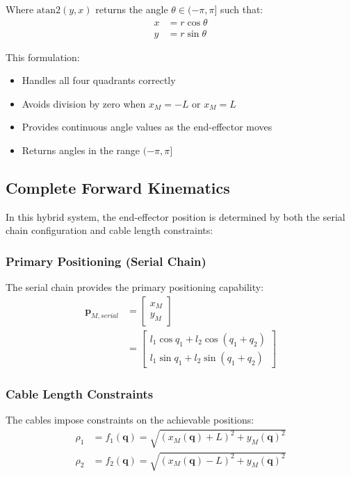 \documentclass[11pt,a4paper]{article}
\begin{document}
Where $\text{atan2}(y, x)$ returns the angle $\theta \in (-\pi, \pi]$ such that:
\begin{align}
x &= r\cos\theta \\
y &= r\sin\theta
\end{align}

This formulation:
\begin{itemize}
    \item Handles all four quadrants correctly
    \item Avoids division by zero when $x_M = -L$ or $x_M = L$
    \item Provides continuous angle values as the end-effector moves
    \item Returns angles in the range $(-\pi, \pi]$
\end{itemize}

\subsection{Complete Forward Kinematics}
In this hybrid system, the end-effector position is determined by both the serial chain configuration and cable length constraints:

\subsubsection{Primary Positioning (Serial Chain)}
The serial chain provides the primary positioning capability:
\begin{align}
\bm{p}_{M,serial} &= \begin{bmatrix} x_M \\ y_M \end{bmatrix} \\
&= \begin{bmatrix} l_1 \cos q_1 + l_2 \cos(q_1 + q_2) \\ l_1 \sin q_1 + l_2 \sin(q_1 + q_2) \end{bmatrix}
\end{align}

\subsubsection{Cable Length Constraints}
The cables impose constraints on the achievable positions:
\begin{align}
\rho_1 &= f_1(\bm{q}) = \sqrt{(x_M(\bm{q}) + L)^2 + y_M(\bm{q})^2} \\
\rho_2 &= f_2(\bm{q}) = \sqrt{(x_M(\bm{q}) - L)^2 + y_M(\bm{q})^2}
\end{align}
\end{document}
